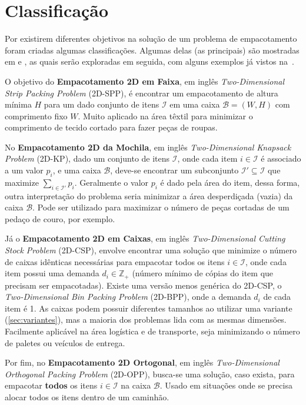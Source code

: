 \section{Classificação}\label{sec:classificacao}

Por existirem diferentes objetivos na solução de um problema de empacotamento foram criadas algumas
classificações.
Algumas delas (as principais) são mostradas em  e
, as quais serão exploradas em seguida, com alguns exemplos já vistos
na~.

O objetivo do \textbf{Empacotamento 2D em Faixa}, em inglês \textit{Two-Dimensional Strip Packing
Problem} (2D-SPP), é encontrar um empacotamento de altura mínima $H$ para um dado conjunto de itens
$\mathcal{I}$ em uma caixa $\mathcal{B} = (W, H)$ com comprimento fixo $W$.
Muito aplicado na área têxtil para minimizar o comprimento de tecido cortado para fazer peças
de roupas.

No \textbf{Empacotamento 2D da Mochila}, em inglês \textit{Two-Dimensional Knapsack Problem} (2D-KP),
dado um conjunto de itens $\mathcal{I}$, onde cada item $i \in \mathcal{I}$ é associado a um valor
$p_i$, e uma caixa $\mathcal{B}$, deve-se encontrar um subconjunto $\mathcal{I}' \subseteq
\mathcal{I}$ que maximize $\sum_{i \in \mathcal{I'}}^{} p_i$.
Geralmente o valor $p_i$ é dado pela área do item, dessa forma, outra interpretação do problema
seria minimizar a área desperdiçada (vazia) da caixa $\mathcal{B}$.
Pode ser utilizado para maximizar o número de peças cortadas de um pedaço de couro, por exemplo.


Já o \textbf{Empacotamento 2D em Caixas}, em inglês \textit{Two-Dimensional Cutting Stock Problem}
(2D-CSP), envolve encontrar uma solução que minimize o número de caixas idênticas necessárias para
empacotar todos os itens $i \in \mathcal{I}$, onde cada item possui uma demanda
$d_i \in \mathbb{Z}_+$ (número mínimo de cópias do item que precisam ser empacotadas).
Existe uma versão menos genérica do 2D-CSP, o \textit{Two-Dimensional Bin Packing Problem} (2D-BPP),
onde a demanda $d_i$ de cada item é 1.
As caixas podem possuir diferentes tamanhos ao utilizar uma variante (\cref{sec:variantes}),
mas a maioria dos problemas lida com as mesmas dimensões.
Facilmente aplicável na área logística e de transporte, seja minimizando o número de paletes
ou veículos de entrega.

Por fim, no \textbf{Empacotamento 2D Ortogonal}, em inglês \textit{Two-Dimensional Orthogonal
Packing Problem} (2D-OPP), busca-se uma solução, caso exista, para empacotar \textbf{todos} os
itens $i \in \mathcal{I}$ na caixa $\mathcal{B}$.
Usado em situações onde se precisa alocar todos os itens dentro de um caminhão.

